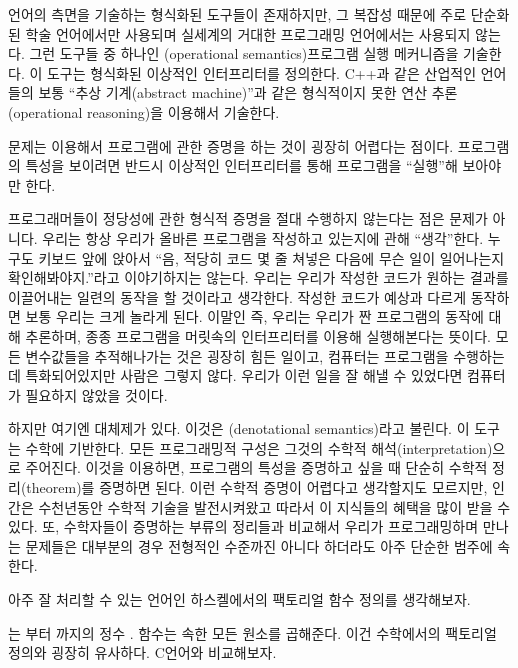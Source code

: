 언어의  측면을 기술하는 형식화된 도구들이 존재하지만, 그 복잡성 때문에 주로 단순화된 학술 언어에서만 사용되며 실세계의 거대한 프로그래밍 언어에서는 사용되지 않는다.
그런 도구들 중 하나인 \newterm{\trOperationalSemantics}(operational semantics)\는 프로그램 실행 메커니즘을 기술한다. 이 도구는 형식화된 이상적인 인터프리터를 정의한다.
C++과 같은 산업적인 언어들의 \trSemantics\는 보통 ``추상 기계(abstract machine)''과 같은 형식적이지 못한 연산 추론(operational reasoning)을 이용해서 기술한다.

문제는 \trOperationalSemantics\를 이용해서 프로그램에 관한 증명을 하는 것이 굉장히 어렵다는 점이다. 프로그램의 특성을 보이려면 반드시 이상적인 인터프리터를 통해 프로그램을 ``실행''해 보아야만 한다.

프로그래머들이 정당성에 관한 형식적 증명을 절대 수행하지 않는다는 점은 문제가 아니다. 우리는 항상 우리가 올바른 프로그램을 작성하고 있는지에 관해 ``생각''한다.
누구도 키보드 앞에 앉아서 ``음, 적당히 코드 몇 줄 쳐넣은 다음에 무슨 일이 일어나는지 확인해봐야지.''라고 이야기하지는 않는다.
우리는 우리가 작성한 코드가 원하는 결과를 이끌어내는 일련의 동작을 할 것이라고 생각한다. 작성한 코드가 예상과 다르게 동작하면 보통 우리는 크게 놀라게 된다.
이말인 즉, 우리는 우리가 짠 프로그램의 동작에 대해 추론하며, 종종 프로그램을 머릿속의 인터프리터를 이용해 실행해본다는 뜻이다.
모든 변수값들을 추적해나가는 것은 굉장히 힘든 일이고, 컴퓨터는 프로그램을 수행하는데 특화되어있지만 사람은 그렇지 않다.
우리가 이런 일을 잘 해낼 수 있었다면 컴퓨터가 필요하지 않았을 것이다.

하지만 여기엔 대체제가 있다. 이것은 \newterm{\trDenotationalSemantics}(denotational semantics)라고 불린다. 이 도구는 수학에 기반한다.
 모든 프로그래밍적 구성은 그것의 수학적 해석(interpretation)으로 주어진다.
이것을 이용하면, 프로그램의 특성을 증명하고 싶을 때 단순히 수학적 정리(theorem)를 증명하면 된다.
이런 수학적 증명이 어렵다고 생각할지도 모르지만, 인간은 수천년동안 수학적 기술을 발전시켜왔고 따라서 이 지식들의 혜택을 많이 받을 수 있다.
또, 수학자들이 증명하는 부류의 정리들과 비교해서 우리가 프로그래밍하며 만나는 문제들은 대부분의 경우 전형적인 수준까진 아니다 하더라도 아주 단순한 범주에 속한다.

 아주 잘 처리할 수 있는 언어인 하스켈에서의 팩토리얼 함수 정의를 생각해보자. 


\trExpression \code{{[}1..n{]}} 는  부터 까지의 정수 \trList{}.   함수는  속한 모든 원소를 곱해준다. 이건 수학에서의 팩토리얼 정의와 굉장히 유사하다. C언어와 비교해보자.

